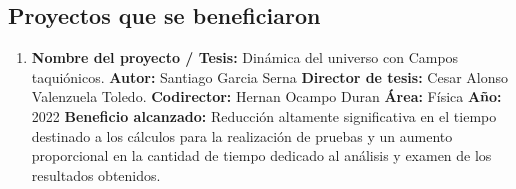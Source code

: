 \begin{spacing}{1.5}
    \begin{tightcenter}
    \section{Proyectos que se beneficiaron}
    \end{tightcenter}
    
    \begin{enumerate}
        \item \textbf{Nombre del proyecto / Tesis:} Dinámica del universo con Campos taquiónicos. \newline
        \textbf{Autor:} Santiago Garcia Serna \newline
        \textbf{Director de tesis:} Cesar Alonso Valenzuela Toledo. \newline
        \textbf{Codirector:} Hernan Ocampo Duran \newline
        \textbf{Área:} Física \newline
        \textbf{Año:} 2022 \newline
        \textbf{Beneficio alcanzado:} Reducción altamente significativa en el tiempo destinado a los cálculos para la realización de pruebas y un aumento proporcional en la cantidad de tiempo dedicado al análisis y examen de los resultados obtenidos.
    \end{enumerate}

    
    \mylinespacing
    \mylinespacing
    \begin{tightcenter}
    \end{tightcenter}
    \end{spacing}
    